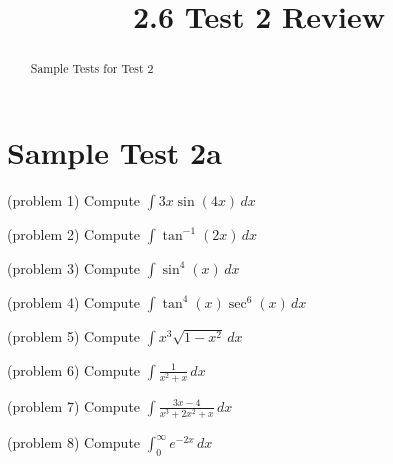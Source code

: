 \documentclass{ximera}
\title{2.6 Test 2 Review}
\begin{document}
\begin{abstract}
Sample Tests for Test 2
\end{abstract}

\maketitle

\section{Sample Test 2a}





\begin{problem}(problem 1)
Compute $\displaystyle \int 3x\sin(4x) \, dx$

\end{problem}


\begin{problem}(problem 2)
Compute $\displaystyle \int \tan^{-1}(2x) \, dx$

\end{problem}

\begin{problem}(problem 3)
Compute $\displaystyle \int \sin^4(x) \, dx$

\end{problem}

\begin{problem}(problem 4)
Compute $\displaystyle \int \tan^4(x) \sec^6(x) \, dx$

\end{problem}

\begin{problem}(problem 5)
Compute $\displaystyle \int x^3 \sqrt{1-x^2} \, dx$

\end{problem}

\begin{problem}(problem 6)
Compute $\displaystyle \int \frac{1}{x^2 + x} \, dx$

\end{problem}

\begin{problem}(problem 7)
Compute $\displaystyle \int \frac{3x-4}{x^3 +2x^2 +x} \, dx$

\end{problem}

\begin{problem}(problem 8)
Compute $\displaystyle \int_0^\infty e^{-2x} \, dx$

\end{problem}
\end{document}
